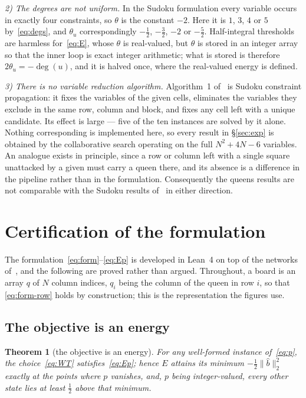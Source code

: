 \documentclass{easychair}
\newtheorem{thm}{Theorem}[section]
\newcommand{\secref}[1]{\hyperref[#1]{\textcolor{academicpurple}{\S\ref*{#1}}}}
\newcommand{\citeref}[1]{\textcolor{academicpurple}{\cite{#1}}}
\begin{document}
\emph{2) The degrees are not uniform.} In the Sudoku formulation every variable occurs in exactly
four constraints, so $\theta$ is the constant $-2$. Here it is $1$, $3$, $4$ or $5$
by~\eqref{eq:degs}, and $\theta_u$ correspondingly $-\tfrac12$, $-\tfrac32$, $-2$ or $-\tfrac52$.
Half-integral thresholds are harmless for~\eqref{eq:E}, whose $\theta$ is real-valued, but $\theta$
is stored in an integer array so that the inner loop is exact integer arithmetic; what is stored is
therefore $2\theta_u = -\deg(u)$, and it is halved once, where the real-valued energy is defined.

\emph{3) There is no variable reduction algorithm.} Algorithm~1 of~\citeref{liwang2022} is Sudoku
constraint propagation: it fixes the variables of the given cells, eliminates the variables they
exclude in the same row, column and block, and fixes any cell left with a unique candidate. Its
effect is large --- five of the ten instances are solved by it alone. Nothing corresponding is
implemented here, so every result in \secref{sec:exp} is obtained by the collaborative search
operating on the full $N^2+4N-6$ variables. An analogue exists in principle, since a row or column
left with a single square unattacked by a given must carry a queen there, and its absence is a
difference in the pipeline rather than in the formulation. Consequently the queens results are not
comparable with the Sudoku results of~\citeref{liwang2022} in either direction.

\section{Certification of the formulation}\label{sec:cert}

The formulation~\eqref{eq:form}--\eqref{eq:Ep} is developed in Lean~4 on top of the networks
of~\citeref{hnbm}, and the following are proved rather than argued. Throughout, a board is an array
$q$ of $N$ column indices, $q_i$ being the column of the queen in row $i$, so that
\eqref{eq:form-row} holds by construction; this is the representation the figures use.

\subsection{The objective is an energy}\label{sec:energy}

\begin{thm}[the objective is an energy]\label{thm:net}
For any well-formed instance of~\eqref{eq:p}, the choice~\eqref{eq:WT} satisfies~\eqref{eq:Ep};
hence $E$ attains its minimum $-\tfrac12\lVert \hat b\rVert_2^2$ exactly at the points where $p$
vanishes, and, $p$ being integer-valued, every other state lies at least $\tfrac12$ above that
minimum.
\end{thm}
\end{document}
